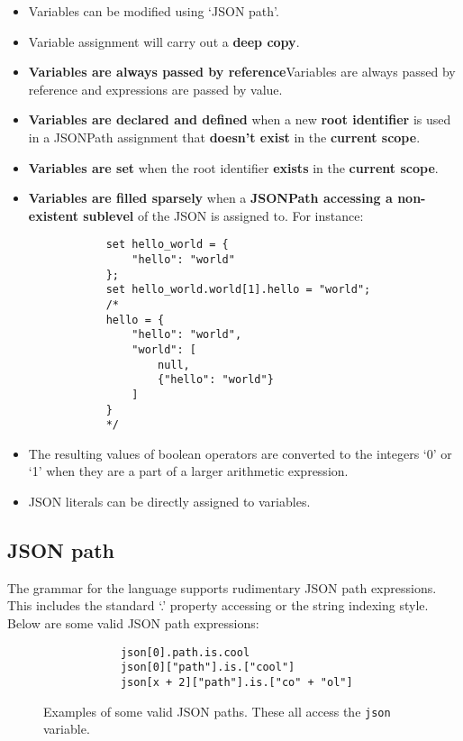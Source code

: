 \documentclass[12pt, letterpaper]{article}
\begin{document}
\begin{center}
    \begin{itemize} 
        \item Variables can be modified using `JSON path'.
        \item Variable assignment will carry out a \textbf{deep copy}.
        \item \textbf{Variables are always passed by reference}{Variables are always passed by reference} and expressions are passed by value.
        \item \textbf{Variables are declared and defined} when a new \textbf{root identifier} is used in a JSONPath assignment that \textbf{doesn't exist} in the \textbf{current scope}.
        \item \textbf{Variables are set} when the root identifier \textbf{exists} in the \textbf{current scope}.
        \item \textbf{Variables are filled sparsely} when a \textbf{JSONPath accessing a non-existent sublevel} of the JSON is assigned to. For instance:
        \begin{verbatim}
            set hello_world = {
                "hello": "world"
            };
            set hello_world.world[1].hello = "world";
            /*
            hello = {
                "hello": "world",
                "world": [
                    null,
                    {"hello": "world"}
                ]
            }
            */
        \end{verbatim}
        \item The resulting values of boolean operators are converted to the integers `0' or `1' when they are a part of a larger arithmetic expression.
        \item JSON literals can be directly assigned to variables.
    \end{itemize}
\end{center}

\subsection{JSON path}

The grammar for the language supports rudimentary JSON path expressions. This includes the standard `.' property accessing or the string indexing style. Below are some valid JSON path expressions:

\begin{figure}[H]
    \begin{center}
        \begin{verbatim}
            json[0].path.is.cool
            json[0]["path"].is.["cool"]
            json[x + 2]["path"].is.["co" + "ol"]
        \end{verbatim}
    \end{center}
    \vspace{-1.5em}
    \cprotect\caption{Examples of some valid JSON paths. These all access the \verb|json| variable.}
\end{figure}
\end{document}

